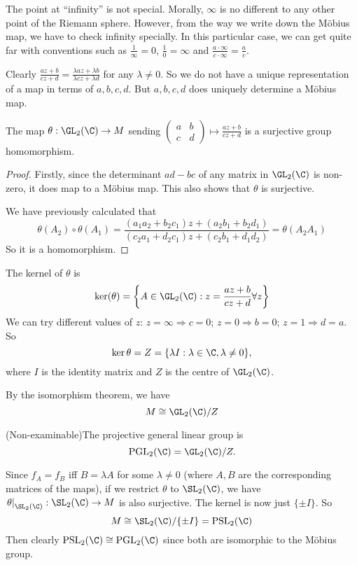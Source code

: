 \documentclass[a4paper]{article}
\begin{document}
  \note The point at ``infinity'' is not special. Morally, $\infty$ is no different to any other point of the Riemann sphere. However, from the way we write down the M\"obius map, we have to check infinity specially. In this particular case, we can get quite far with conventions such as $\frac{1}{\infty} = 0$, $\frac{1}{0} = \infty$ and $\frac{a\cdot \infty}{c\cdot \infty} = \frac{a}{c}$.

  Clearly $\frac{az + b}{cz + d} = \frac{\lambda az + \lambda b}{\lambda cz + \lambda d}$ for any $\lambda \not= 0$. So we do not have a unique representation of a map in terms of $a, b, c, d$. But $a, b, c, d$ does uniquely determine a M\"obius map.

  \begin{prop}
    The map $\theta: \GL_2(\C)\to M$ sending $
    \displaystyle \begin{pmatrix}
      a & b\\
      c & d
    \end{pmatrix} \mapsto \frac{az + b}{cz + d}$ is a surjective group homomorphism.
  \end{prop}

  \begin{proof}
    Firstly, since the determinant $ad - bc$ of any matrix in $\GL_2(\C)$ is non-zero, it does map to a M\"obius map. This also shows that $\theta$ is surjective.

    We have previously calculated that
    \[
      \theta(A_2)\circ \theta(A_1) = \frac{(a_1a_2 + b_2c_1)z + (a_2b_1 + b_2d_1)}{(c_2a_1 + d_2c_1)z + (c_2b_1 + d_1d_2)} = \theta(A_2A_1)
    \]
    So it is a homomorphism.
  \end{proof}

  The kernel of $\theta$ is
  \[
    \ker(\theta) = \left\{A\in \GL_2(\C): z = \frac{az + b}{cz + d}\forall z\right\}
  \]
  We can try different values of $z$: $z = \infty \Rightarrow c = 0$; $z = 0 \Rightarrow b = 0$; $z = 1\Rightarrow d = a$. So
  \[
    \ker\theta = Z = \{\lambda I: \lambda \in \C, \lambda\not= 0\},
  \]
  where $I$ is the identity matrix and $Z$ is the centre of $\GL_2(\C)$. 

  By the isomorphism theorem, we have
  \[
    M \cong \GL_2(\C)/Z
  \]

  \begin{defi}
    (Non-examinable)The projective general linear group is
    \[
      \mathrm{PGL}_2(\C) = \GL_2(\C)/Z.
    \]
  \end{defi}
  \note Since $f_A = f_B$ iff $B = \lambda A$ for some $\lambda\not= 0$ (where $A, B$ are the corresponding matrices of the maps), if we restrict $\theta$ to $\SL_2(\C)$, we have $\left.\theta\right|_{\SL_2(\C)}: \SL_2(\C)\to M$ is also surjective. The kernel is now just $\{\pm I\}$. So
  \[
    M \cong \SL_2(\C)/\{\pm I\} = \mathrm{PSL_2}(\C)
  \]
  \note Then clearly $\mathrm{PSL}_2(\C)\cong \mathrm{PGL}_2(\C)$ since both are isomorphic to the M\"obius group.
\end{document}
